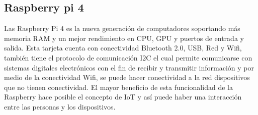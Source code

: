 \subsection{Raspberry pi 4}

Las Raspberry Pi 4 es la nueva generación de computadores soportando más memoria RAM y un mejor rendimiento en CPU, GPU y puertos de entrada y salida. Esta tarjeta cuenta con conectividad Bluetooth 2.0, USB, Red y Wifi, también tiene el protocolo de comunicación I2C el cual permite comunicarse con sistemas digitales electrónicos con el fin de recibir y transmitir información y por medio de la conectividad Wifi, se puede hacer conectividad a la red dispositivos que no tienen conectividad. El mayor beneficio de esta funcionalidad de la Raspberry hace posible el concepto de IoT y así puede haber una interacción entre las personas y los dispositivos. \cite{A39}